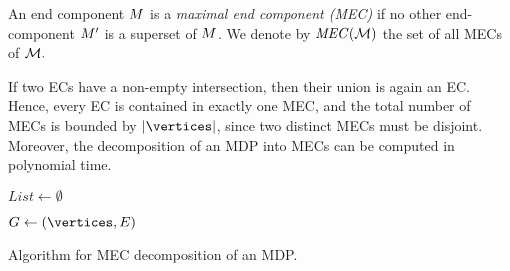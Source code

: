 \begin{definition}
	\label{5-def:mec}
An end component $ M $ is a \emph{maximal end component (MEC)} if no other end-component $ M' $ is a superset of $ M $. We denote by $\mathit{MEC}(\mathcal{M})$ the set of all MECs of $\mathcal{M}.$
\end{definition} 

If two ECs have a non-empty intersection, then their union is again an EC. Hence, every EC is contained in exactly one MEC, and the total number of MECs is bounded by $ |\vertices| $, since two distinct MECs must be disjoint. Moreover, the decomposition of an MDP into MECs can be computed in polynomial time.

\begin{algorithm}
	
	$\textit{List} \leftarrow \emptyset$ 
	
	$ G \leftarrow (\vertices,\edges) $  
	
	
	
	
	\caption{Algorithm for MEC decomposition of an MDP.}
	\label{5-algo:MEC-decomposition}
\end{algorithm}

